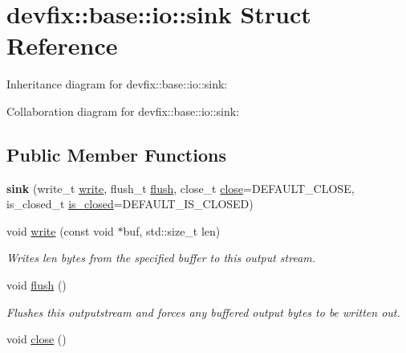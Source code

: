 \hypertarget{structdevfix_1_1base_1_1io_1_1sink}{}\section{devfix\+:\+:base\+:\+:io\+:\+:sink Struct Reference}
\label{structdevfix_1_1base_1_1io_1_1sink}


Inheritance diagram for devfix\+:\+:base\+:\+:io\+:\+:sink\+:


Collaboration diagram for devfix\+:\+:base\+:\+:io\+:\+:sink\+:
\subsection*{Public Member Functions}
\begin{DoxyCompactItemize}
\item 
\mbox{\label{structdevfix_1_1base_1_1io_1_1sink_a5e065482904521fde4ac8d0e378529c8}} 
{\bfseries sink} (write\+\_\+t \hyperlink{structdevfix_1_1base_1_1io_1_1sink_a6eade9933d316139e952b7a442f3c56d}{write}, flush\+\_\+t \hyperlink{structdevfix_1_1base_1_1io_1_1sink_abf208747c9be8295972fbc4696ddc557}{flush}, close\+\_\+t \hyperlink{structdevfix_1_1base_1_1io_1_1sink_a2d110d27baa88f462540e7fd59fb8b3c}{close}=D\+E\+F\+A\+U\+L\+T\+\_\+\+C\+L\+O\+SE, is\+\_\+closed\+\_\+t \hyperlink{structdevfix_1_1base_1_1io_1_1sink_a1e5782219f9256d8ff09385fa6f3b156}{is\+\_\+closed}=D\+E\+F\+A\+U\+L\+T\+\_\+\+I\+S\+\_\+\+C\+L\+O\+S\+ED)
\item 
void \hyperlink{structdevfix_1_1base_1_1io_1_1sink_a6eade9933d316139e952b7a442f3c56d}{write} (const void $\ast$buf, std\+::size\+\_\+t len)
\begin{DoxyCompactList}\small\item\em Writes len bytes from the specified buffer to this output stream. \end{DoxyCompactList}\item 
void \hyperlink{structdevfix_1_1base_1_1io_1_1sink_abf208747c9be8295972fbc4696ddc557}{flush} ()
\begin{DoxyCompactList}\small\item\em Flushes this {\itshape outputstream} and forces any buffered output bytes to be written out. \end{DoxyCompactList}\item 
void \hyperlink{structdevfix_1_1base_1_1io_1_1sink_a2d110d27baa88f462540e7fd59fb8b3c}{close} ()

\end{DoxyCompactItemize}
